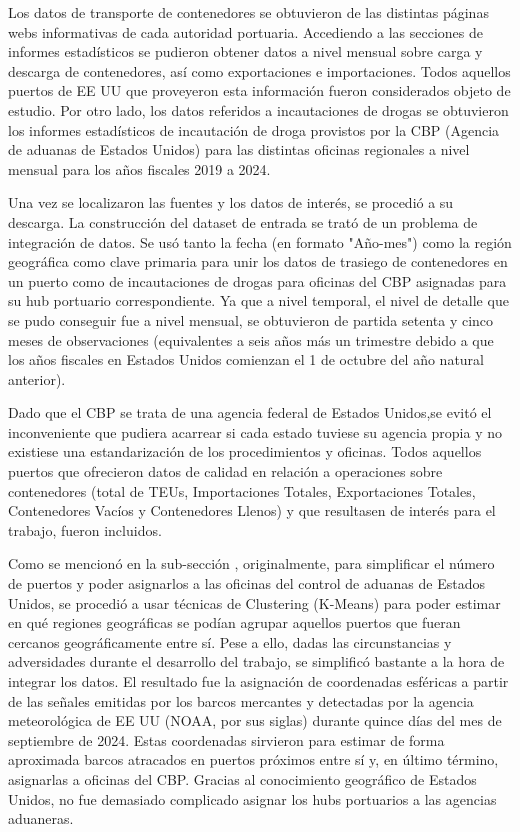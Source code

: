 \documentclass{article}
\begin{document}
		Los datos de transporte de contenedores se obtuvieron de las distintas páginas webs informativas de cada autoridad portuaria. Accediendo a las secciones de informes estadísticos se pudieron obtener datos a nivel mensual sobre carga y descarga de contenedores, así como exportaciones e importaciones. Todos aquellos puertos de EE UU que proveyeron esta información fueron considerados objeto de estudio. Por otro lado, los datos referidos a incautaciones de drogas se obtuvieron los informes estadísticos de incautación de droga provistos por la CBP (Agencia de aduanas de Estados Unidos) para las distintas oficinas regionales a nivel mensual para los años fiscales 2019 a 2024.\
		
		Una vez se localizaron las fuentes y los datos de interés, se procedió a su descarga. La construcción del dataset de entrada se trató de un problema de integración de datos. Se usó tanto la fecha (en formato "Año-mes") como la región geográfica como clave primaria para unir los datos de trasiego de contenedores en un puerto como de incautaciones de drogas para oficinas del CBP asignadas para su hub portuario correspondiente. Ya que a nivel temporal, el nivel de detalle que se pudo conseguir fue a nivel mensual, se obtuvieron de partida setenta y cinco meses de observaciones (equivalentes a seis años más un trimestre debido a que los años fiscales en Estados Unidos comienzan el 1 de octubre del año natural anterior).\
		
		Dado que el CBP se trata de una agencia federal de Estados Unidos,se evitó el inconveniente que pudiera acarrear si cada estado tuviese su agencia propia y no existiese una estandarización de los procedimientos y oficinas. Todos aquellos puertos que ofrecieron datos de calidad en relación a operaciones sobre contenedores (total de TEUs, Importaciones Totales, Exportaciones Totales, Contenedores Vacíos y Contenedores Llenos) y que resultasen de interés para el trabajo, fueron incluidos.\
		
		Como se mencionó en la sub-sección \cite[Técnicas de clustering]{keylist}, originalmente, para simplificar el número de puertos y poder asignarlos a las oficinas del control de aduanas de Estados Unidos, se procedió a usar técnicas de Clustering (K-Means) para poder estimar en qué regiones geográficas se podían agrupar aquellos puertos que fueran cercanos geográficamente entre sí. Pese a ello, dadas las circunstancias y adversidades durante el desarrollo del trabajo, se simplificó bastante a la hora de integrar los datos. El resultado fue la asignación de coordenadas esféricas a partir de las señales emitidas por los barcos mercantes y detectadas por la agencia meteorológica de EE UU (NOAA, por sus siglas) durante quince días del mes de septiembre de 2024. Estas coordenadas sirvieron para estimar de forma aproximada barcos atracados en puertos próximos entre sí y, en último término, asignarlas a oficinas del CBP. Gracias al conocimiento geográfico de Estados Unidos, no fue demasiado complicado asignar los hubs portuarios a las agencias aduaneras.\
		
\end{document}
